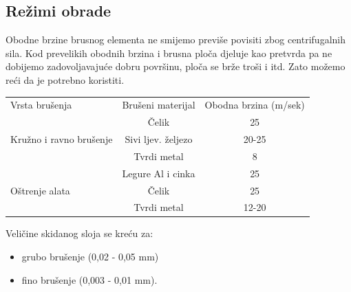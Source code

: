 \documentclass[a4paper,12pt]{article}
\numberwithin{figure}{section}
\begin{document}
\subsection{Režimi obrade}
Obodne brzine brusnog elementa ne smijemo previše povisiti zbog centrifugalnih sila. Kod prevelikih obodnih brzina i brusna ploča djeluje kao pretvrda pa ne dobijemo zadovoljavajuće dobru površinu, ploča se brže troši i itd. Zato možemo reći da je potrebno koristiti.
\begin{table}[!h]
\centering
\begin{tabular}{lcc}
Vrsta brušenja          & Brušeni materijal  & Obodna brzina (m/sek) \\
                        & Čelik              & 25                    \\
Kružno i ravno brušenje & Sivi ljev. željezo & 20-25                 \\
                        & Tvrdi metal        & 8                     \\
                        & Legure Al i cinka  & 25                    \\
Oštrenje alata          & Čelik              & 25                    \\
                        & Tvrdi metal        & 12-20                
\end{tabular}
\end{table}
\FloatBarrier
Veličine skidanog sloja se kreću za:
\begin{itemize}
\item grubo brušenje (0,02 - 0,05 mm)
\item fino brušenje (0,003 - 0,01 mm).
\end{itemize}
\end{document}
